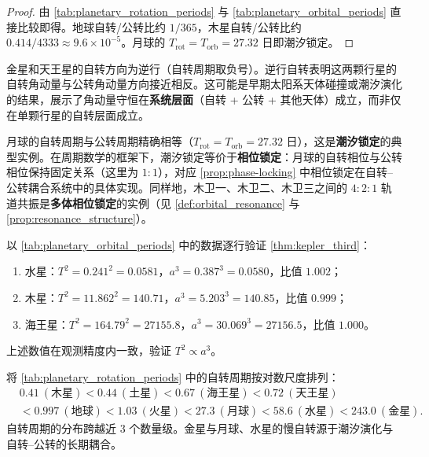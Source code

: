 \begin{proof}
由 \cref{tab:planetary_rotation_periods} 与 \cref{tab:planetary_orbital_periods} 直接比较即得。地球自转/公转比约 $1/365$，木星自转/公转比约 $0.414/4333\approx 9.6\times 10^{-5}$。月球的 $T_{\text{rot}}=T_{\text{orb}}=27.32$ 日即潮汐锁定。
\end{proof}

\begin{remark}[自转方向与角动量守恒]\label{rem:astro_retrograde}
金星和天王星的自转方向为逆行（自转周期取负号）。逆行自转表明这两颗行星的自转角动量与公转角动量方向接近相反。这可能是早期太阳系天体碰撞或潮汐演化的结果，展示了角动量守恒在\textbf{系统层面}（自转 + 公转 + 其他天体）成立，而非仅在单颗行星的自转层面成立。
\end{remark}

\begin{remark}[潮汐锁定与相位锁定]\label{rem:astro_tidal_lock}
月球的自转周期与公转周期精确相等（$T_{\text{rot}}=T_{\text{orb}}=27.32$ 日），这是\textbf{潮汐锁定}的典型实例。在周期数学的框架下，潮汐锁定等价于\textbf{相位锁定}：月球的自转相位与公转相位保持固定关系（这里为 $1:1$），对应 \cref{prop:phase-locking} 中相位锁定在自转--公转耦合系统中的具体实现。同样地，木卫一、木卫二、木卫三之间的 $4:2:1$ 轨道共振是\textbf{多体相位锁定}的实例（见 \cref{def:orbital_resonance} 与 \cref{prop:resonance_structure}）。
\end{remark}

\begin{example}[太阳系行星的轨道周期数值验证]\label{ex:astro_solar_system_data}
以 \cref{tab:planetary_orbital_periods} 中的数据逐行验证 \cref{thm:kepler_third}：
\begin{enumerate}[label=(\roman*)]
    \item 水星：$T^2=0.241^2=0.0581$，$a^3=0.387^3=0.0580$，比值 $1.002$；
    \item 木星：$T^2=11.862^2=140.71$，$a^3=5.203^3=140.85$，比值 $0.999$；
    \item 海王星：$T^2=164.79^2=27155.8$，$a^3=30.069^3=27156.5$，比值 $1.000$。
\end{enumerate}
上述数值在观测精度内一致，验证 $T^2\propto a^3$。
\end{example}

\begin{example}[自转周期的多尺度结构]\label{ex:astro_rotation_multi_scale}
将 \cref{tab:planetary_rotation_periods} 中的自转周期按对数尺度排列：
\[
\begin{aligned}
&0.41\ (\text{木星})<0.44\ (\text{土星})<0.67\ (\text{海王星})<0.72\ (\text{天王星})\\
&<0.997\ (\text{地球})<1.03\ (\text{火星})<27.3\ (\text{月球})<58.6\ (\text{水星})<243.0\ (\text{金星}).
\end{aligned}
\]
自转周期的分布跨越近 $3$ 个数量级。金星与月球、水星的慢自转源于潮汐演化与自转--公转的长期耦合。
\end{example}


